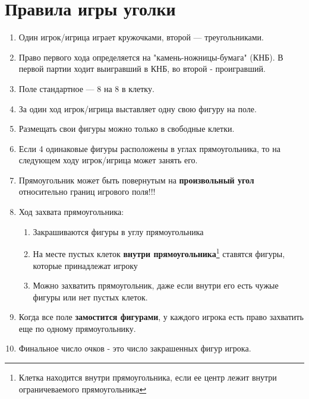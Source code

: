 \documentclass[11pt]{article} %
\begin{document}
\section*{Правила игры уголки}
\begin{enumerate}
    \item Один игрок/игрица играет кружочками, второй — треугольниками. 
    \item Право первого хода определяется на "камень-ножницы-бумага" (КНБ). В первой партии ходит выигравший в КНБ, во второй - проигравший.
    \item Поле стандартное — 8 на 8 в клетку. 
    \item За один ход игрок/игрица выставляет одну свою фигуру на поле. 
    \item Размещать свои фигуры можно только в свободные клетки.
    \item Если 4 одинаковые фигуры расположены в углах прямоугольника, то на следующем ходу игрок/игрица может занять его.
    \item Прямоугольник может быть повернутым на \textbf{произвольный угол} относительно границ игрового поля!!!
    \item Ход захвата прямоугольника: \begin{enumerate}
        \item Закрашиваются фигуры в углу прямоугольника
        \item На месте пустых клеток \textbf{внутри прямоугольника}\footnote{Клетка находится внутри прямоугольника, если ее центр лежит внутри ограничеваемого прямоугольника} ставятся фигуры, которые принадлежат игроку
        \item Можно захватить прямоугольник, даже если внутри его есть чужые фигуры или нет пустых клеток.
    \end{enumerate}
    \item Когда все поле \textbf{замостится фигурами}, у каждого игрока есть право захватить еще по одному прямоугольнику.
    \item Финальное число очков - это число закрашенных фигур игрока.
\end{enumerate}
\end{document}
